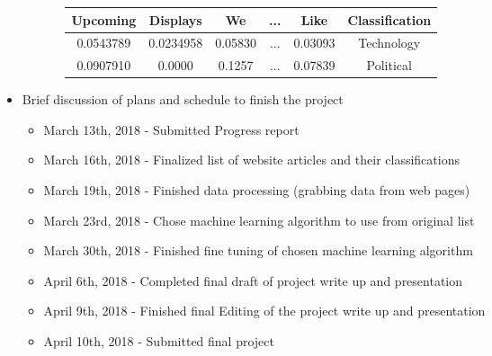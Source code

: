 \documentclass[fleqn,11pt]{article}
\begin{document}
\begin{itemize}
\begin{itemize}
\begin{itemize}
            \begin{tabular}{|cccccc|}
              \hline
              Upcoming  & Displays  & We      & ... & Like    & Classification\\
              \hline
              0.0543789 & 0.0234958 & 0.05830 & ... & 0.03093 & Technology\\
              0.0907910 & 0.0000    & 0.1257  & ... & 0.07839 & Political\\
              \hline
            \end{tabular}
          \end{itemize}
      \end{itemize}
      \item Brief discussion of plans and schedule to finish the project
      \begin{itemize}
        \item March 13th, 2018 - Submitted Progress report
        \item March 16th, 2018 - Finalized list of website articles and their classifications
        \item March 19th, 2018 - Finished data processing (grabbing data from web pages)
        \item March 23rd, 2018 - Chose machine learning algorithm to use from original list
        \item March 30th, 2018 - Finished fine tuning of chosen machine learning algorithm
        \item April 6th, 2018 - Completed final draft of project write up and presentation
        \item April 9th, 2018 - Finished final Editing of the project write up and presentation
        \item April 10th, 2018 - Submitted final project
      \end{itemize}
  \end{itemize}
\end{document}

